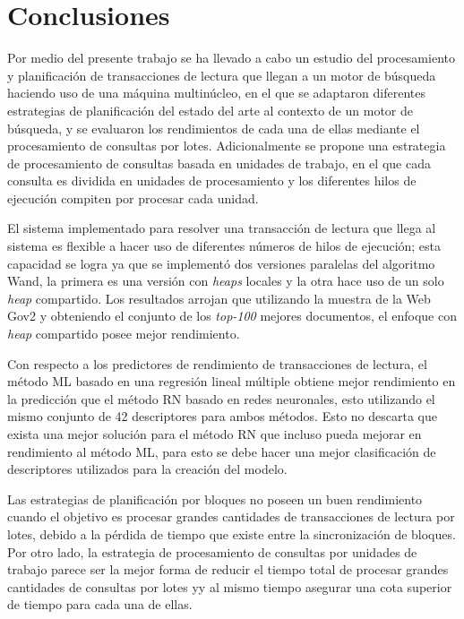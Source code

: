 \chapter{Conclusiones}
\label{cap:conclu}
Por medio del presente trabajo se ha llevado a cabo un estudio del procesamiento y planificación de transacciones de lectura que llegan a un motor de búsqueda haciendo uso de una máquina multinúcleo, en el que se adaptaron diferentes estrategias de planificación del estado del arte al contexto de un motor de búsqueda, y se evaluaron los rendimientos de cada una de ellas mediante el procesamiento de consultas por lotes. Adicionalmente se propone una estrategia de procesamiento de consultas basada en unidades de trabajo, en el que cada consulta es dividida en unidades de procesamiento y los diferentes hilos de ejecución compiten por procesar cada unidad.

El sistema implementado para resolver una transacción de lectura que llega al sistema es flexible a hacer uso de diferentes números de hilos de ejecución; esta capacidad se logra ya que se implementó dos versiones paralelas del algoritmo Wand, la primera es una versión con \textit{heaps} locales y la otra hace uso de un solo \textit{heap} compartido. Los resultados arrojan que utilizando la muestra de la Web Gov2 y obteniendo el conjunto de los \textit{top-100} mejores documentos, el enfoque con \textit{heap} compartido posee mejor rendimiento. 

Con respecto a los predictores de rendimiento de transacciones de lectura, el método ML basado en una regresión lineal múltiple obtiene mejor rendimiento en la predicción que el método RN basado en redes neuronales, esto utilizando el mismo conjunto de 42 descriptores para ambos métodos. Esto no descarta que exista una mejor solución para el método RN que incluso pueda mejorar en rendimiento al método ML, para esto se debe hacer una mejor clasificación de descriptores utilizados para la creación del modelo.
 
Las estrategias de planificación por bloques no poseen un buen rendimiento cuando el objetivo es procesar grandes cantidades de transacciones de lectura por lotes, debido a la pérdida de tiempo que existe entre la sincronización de bloques. Por otro lado, la estrategia de procesamiento de consultas por unidades de trabajo parece ser la mejor forma de reducir el tiempo total de procesar grandes cantidades de consultas por lotes yy al mismo tiempo asegurar una cota superior de tiempo para cada una de ellas.

